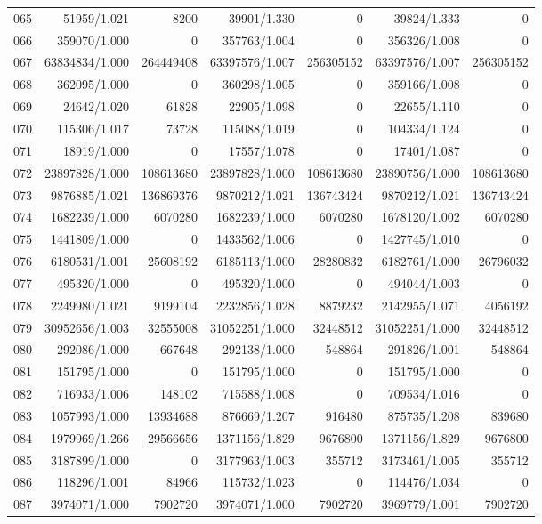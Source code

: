 \begin{longtable}{crrrrrr}
065 & 51959/1.021 & 8200 & 39901/1.330 & 0 & 39824/1.333 & 0 \\
066 & 359070/1.000 & 0 & 357763/1.004 & 0 & 356326/1.008 & 0 \\
067 & 63834834/1.000 & 264449408 & 63397576/1.007 & 256305152 & 63397576/1.007 & 256305152 \\
068 & 362095/1.000 & 0 & 360298/1.005 & 0 & 359166/1.008 & 0 \\
069 & 24642/1.020 & 61828 & 22905/1.098 & 0 & 22655/1.110 & 0 \\
070 & 115306/1.017 & 73728 & 115088/1.019 & 0 & 104334/1.124 & 0 \\
071 & 18919/1.000 & 0 & 17557/1.078 & 0 & 17401/1.087 & 0 \\
072 & 23897828/1.000 & 108613680 & 23897828/1.000 & 108613680 & 23890756/1.000 & 108613680 \\
073 & 9876885/1.021 & 136869376 & 9870212/1.021 & 136743424 & 9870212/1.021 & 136743424 \\
074 & 1682239/1.000 & 6070280 & 1682239/1.000 & 6070280 & 1678120/1.002 & 6070280 \\
075 & 1441809/1.000 & 0 & 1433562/1.006 & 0 & 1427745/1.010 & 0 \\
076 & 6180531/1.001 & 25608192 & 6185113/1.000 & 28280832 & 6182761/1.000 & 26796032 \\
077 & 495320/1.000 & 0 & 495320/1.000 & 0 & 494044/1.003 & 0 \\
078 & 2249980/1.021 & 9199104 & 2232856/1.028 & 8879232 & 2142955/1.071 & 4056192 \\
079 & 30952656/1.003 & 32555008 & 31052251/1.000 & 32448512 & 31052251/1.000 & 32448512 \\
080 & 292086/1.000 & 667648 & 292138/1.000 & 548864 & 291826/1.001 & 548864 \\
081 & 151795/1.000 & 0 & 151795/1.000 & 0 & 151795/1.000 & 0 \\
082 & 716933/1.006 & 148102 & 715588/1.008 & 0 & 709534/1.016 & 0 \\
083 & 1057993/1.000 & 13934688 & 876669/1.207 & 916480 & 875735/1.208 & 839680 \\
084 & 1979969/1.266 & 29566656 & 1371156/1.829 & 9676800 & 1371156/1.829 & 9676800 \\
085 & 3187899/1.000 & 0 & 3177963/1.003 & 355712 & 3173461/1.005 & 355712 \\
086 & 118296/1.001 & 84966 & 115732/1.023 & 0 & 114476/1.034 & 0 \\
087 & 3974071/1.000 & 7902720 & 3974071/1.000 & 7902720 & 3969779/1.001 & 7902720 \\

\end{longtable}
